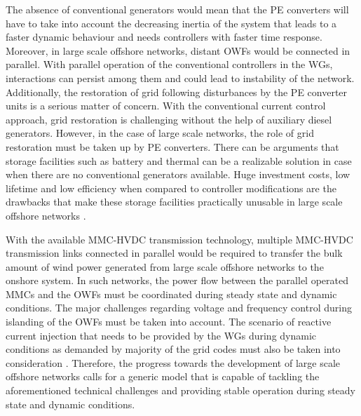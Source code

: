 The absence of conventional generators would mean that the \gls{PE} converters will have to take into account the decreasing inertia of the system that leads to a faster dynamic behaviour and needs controllers with faster time response. Moreover, in large scale offshore networks, distant \gls{OWF}s would be connected in parallel. With parallel operation of the conventional controllers in the \gls{WG}s, interactions can persist among them and could lead to instability of the network. Additionally, the restoration of grid following disturbances by the \gls{PE} converter units is a serious matter of concern. With the conventional current control approach, grid restoration is challenging without the help of auxiliary diesel generators. However, in the case of large scale networks, the role of grid restoration must be taken up by \gls{PE} converters. There can be arguments that storage facilities such as battery and thermal can be a realizable solution in case when there are no conventional generators available. Huge investment costs, low lifetime and low efficiency when compared to controller modifications are the drawbacks that make these storage facilities practically unusable in large scale offshore networks \cite{telaretti_economic_2016}.

With the available \gls{MMC}-\gls{HVDC} transmission technology, multiple \gls{MMC}-\gls{HVDC} transmission links connected in parallel would be required to transfer the bulk amount of wind power generated from large scale offshore networks to the onshore system. In such networks, the power flow between the parallel operated \gls{MMC}s and the \gls{OWF}s must be coordinated during steady state and dynamic conditions. The major challenges regarding voltage and frequency control during islanding of the \gls{OWF}s must be taken into account. The scenario of reactive current injection that needs to be provided by the \gls{WG}s during dynamic conditions as demanded by majority of the grid codes must also be taken into consideration \cite{mohseni_review_2012}. Therefore, the progress towards the development of large scale offshore networks calls for a generic model that is capable of tackling the aforementioned technical challenges and providing stable operation during steady state and dynamic conditions. 


